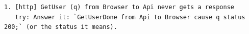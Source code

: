 \begin{lstlisting}[language={},basicstyle=\ttfamily\footnotesize,breaklines=true]
1. [http] GetUser (q) from Browser to Api never gets a response
   try: Answer it: `GetUserDone from Api to Browser cause q status 200;` (or the status it means).
\end{lstlisting}
